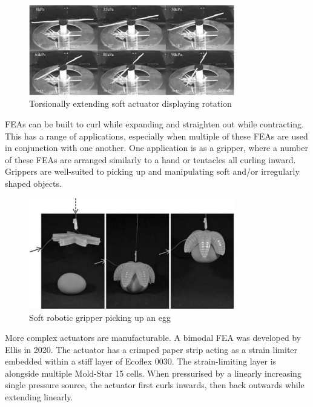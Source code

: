 \begin{figure}[H]
	\centering
	\includegraphics[width=0.8\textwidth]{TorsionalExtension.png}
	\caption[Torsionally extending soft actuator]{Torsionally extending soft actuator displaying rotation \citep{Yan2018}}
	\label{fig:tea}
\end{figure}

FEAs can be built to curl while expanding and straighten out while contracting. This has a range of applications, especially when multiple of these FEAs are used in conjunction with one another. One application is as a gripper, where a number of these FEAs are arranged similarly to a hand or tentacles all curling inward. Grippers are well-suited to picking up and manipulating soft and/or irregularly shaped objects. \citep{Ilievski2011}

\begin{figure}[H]
	\centering
	\includegraphics[width=0.8\textwidth]{Gripper.png}
	\caption[Soft robotic gripper]{Soft robotic gripper picking up an egg \citep{Ilievski2011}}
	\label{fig:grip}
\end{figure}

More complex actuators are manufacturable. A bimodal FEA was developed by Ellis in 2020. The actuator has a crimped paper strip acting as a strain limiter embedded within a stiff layer of Ecoflex 0030. The strain-limiting layer is alongside multiple Mold-Star 15 cells. When pressurised by a linearly increasing single pressure source, the actuator  first curls inwards, then back outwards while extending linearly. \citep{Ellis2020}


